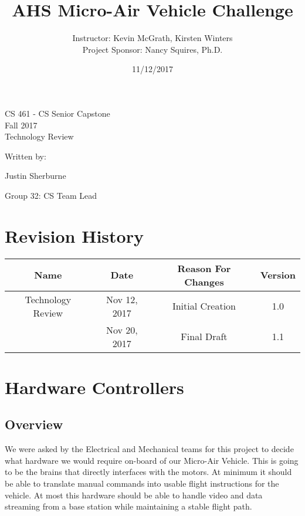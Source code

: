 \documentclass[letterpaper, 10, draftclsnofoot, onecolumn, compsoc]{IEEEtran}
\date{11/12/2017}
\title{AHS Micro-Air Vehicle Challenge}
\author{ Instructor: Kevin McGrath, Kirsten Winters \\
    Project Sponsor: Nancy Squires, Ph.D.}
\def\class{CS 461 - CS Senior Capstone}
\def\term{Fall 2017}
\begin{document}
\null  %
\nointerlineskip  %
\vfill
\let\snewpage \newpage
\let\newpage \relax
\maketitle
\begin{center}
\class\\
\term\\
\huge{Technology Review}\par
\vspace{2mm}
\large{Written by:}\par
\normalsize{Justin Sherburne}\par
\normalsize{Group 32: CS Team Lead} \par
\vspace{8mm}
\end{center}


\let \newpage \snewpage
\vfill 
\break %

\tableofcontents


\section*{Revision History}

\begin{center}
    \begin{tabular}{|c|c|c|c|}
        \hline
		Name & Date & Reason For Changes & Version\\
        \hline
		Technology Review & Nov 12, 2017 & Initial Creation & 1.0\\
        \hline
		& Nov 20, 2017 & Final Draft & 1.1\\
	\hline 
    \end{tabular}
\end{center}



\section{Hardware Controllers}

\subsection{Overview}

We were asked by the Electrical and Mechanical teams for this 
project to decide what hardware we would require on-board of our 
Micro-Air Vehicle. This is going to be the brains that directly 
interfaces with the motors. At minimum it should be able to 
translate manual commands into usable flight instructions for the 
vehicle. At most this hardware should be able to handle video and 
data streaming from a base station while maintaining a stable 
flight path. 
\end{document}
